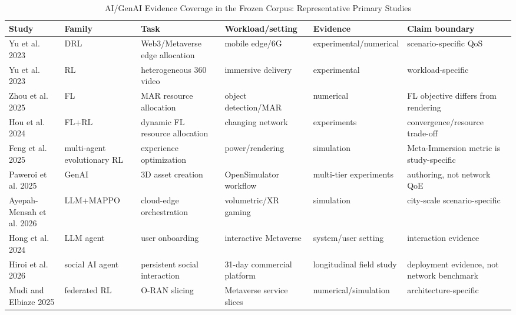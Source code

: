 \begin{table}[!t]\centering\caption{AI/GenAI Evidence Coverage in the Frozen Corpus: Representative Primary Studies}\label{tab:aimatrix}\scriptsize\begin{tabularx}{\textwidth}{p{}p{}p{}p{}p{}Y}\toprule Study&Family&Task&Workload/setting&Evidence&Claim boundary\\\midrule Yu et al. 2023&DRL&Web3/Metaverse edge allocation&mobile edge/6G&experimental/numerical&scenario-specific QoS\\ Yu et al. 2023&RL&heterogeneous 360 video&immersive delivery&experimental&workload-specific\\ Zhou et al. 2025&FL&MAR resource allocation&object detection/MAR&numerical&FL objective differs from rendering\\ Hou et al. 2024&FL+RL&dynamic FL resource allocation&changing network&experiments&convergence/resource trade-off\\ Feng et al. 2025&multi-agent evolutionary RL&experience optimization&power/rendering&simulation&Meta-Immersion metric is study-specific\\ Paweroi et al. 2025&GenAI&3D asset creation&OpenSimulator workflow&multi-tier experiments&authoring, not network QoE\\ Ayepah-Mensah et al. 2026&LLM+MAPPO&cloud-edge orchestration&volumetric/XR gaming&simulation&city-scale scenario-specific\\ Hong et al. 2024&LLM agent&user onboarding&interactive Metaverse&system/user setting&interaction evidence\\ Hiroi et al. 2026&social AI agent&persistent social interaction&31-day commercial platform&longitudinal field study&deployment evidence, not network benchmark\\ Mudi and Elbiaze 2025&federated RL&O-RAN slicing&Metaverse service slices&numerical/simulation&architecture-specific\\\bottomrule\end{tabularx}\end{table}